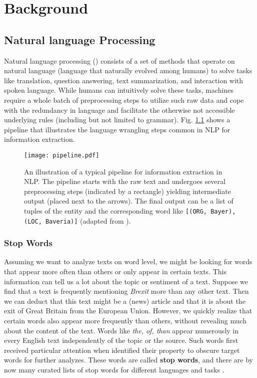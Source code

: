 \chapter{Background}

\section{Natural language Processing}
  Natural language processing () consists of a set of methods that operate on natural language (language that naturally evolved among humans) to solve tasks like translation, question answering, text summarization, and interaction with spoken language.
  While humans can intuitively solve these tasks, machines require a whole batch of preprocessing steps to utilize such raw data and cope with the redundancy in language and facilitate the otherwise not accessible underlying rules (including but not limited to grammar).
  Fig. \ref{fig:pipeline} shows a pipeline that illustrates the language wrangling steps common in NLP for information extraction.

\begin{figure}[h!]
  \centering
  \texttt{[image: pipeline.pdf]}
  \caption{An illustration of a typical pipeline for information extraction in NLP. The pipeline starts with the raw text and undergoes several preprocessing steps (indicated by a rectangle) yielding intermediate output (placed next to the arrows). The final output can be a list of tuples of the entity and the corresponding word like \texttt{[(ORG, \textquotesingle Bayer\textquotesingle), (LOC, \textquotesingle Baveria\textquotesingle)]} (adapted from \citep{Bird2009}).}
\label{fig:pipeline}
\end{figure}

\subsection{Stop Words}
  Assuming we want to analyze texts on word level, we might be looking for
  words that appear more often than others or only appear in certain texts.
  This information can tell us a lot about the topic or sentiment of a text.
  Suppose we find that a text is frequently mentioning \textit{Brexit} more than any other text.
  Then we can deduct that this text might be a (news) article and that it is about the exit of Great Britain from the European Union.
  However, we quickly realize that certain words also appear more frequently than others, without revealing much about the content of the text.
  Words like \textit{the, of, than} appear numerously in every English text independently of the topic or the source.
  Such words first received particular attention when \cite{Luhn1960} identified their property to obscure target words for further analyzes.
  These words are called \textbf{stop words}, and there are by now many curated lists of stop words for different languages and tasks \citep{RANKS2019}.

